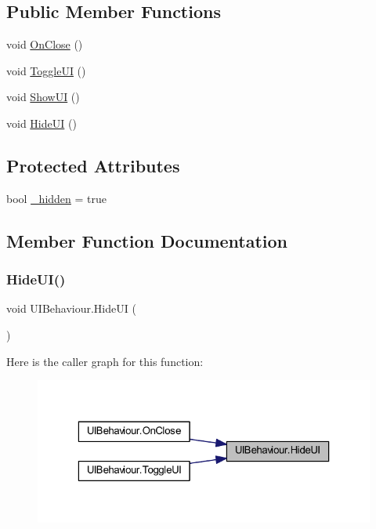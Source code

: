 \subsection*{Public Member Functions}
\begin{DoxyCompactItemize}
\item 
void \mbox{\hyperlink{class_u_i_behaviour_a058150104cbc5deee5bb2d2c8811380a}{On\+Close}} ()
\item 
void \mbox{\hyperlink{class_u_i_behaviour_a508b07927b86c1f75ab1eeb45674f040}{Toggle\+UI}} ()
\item 
void \mbox{\hyperlink{class_u_i_behaviour_a14585d2d40b493d7999564d8a51d51c5}{Show\+UI}} ()
\item 
void \mbox{\hyperlink{class_u_i_behaviour_a16ec3362b1f53b371aa8c5a8a3ec80e7}{Hide\+UI}} ()
\end{DoxyCompactItemize}
\subsection*{Protected Attributes}
\begin{DoxyCompactItemize}
\item 
bool \mbox{\hyperlink{class_u_i_behaviour_a0421d4dc2987f0c48b88cc6175d993e5}{\+\_\+hidden}} = true
\end{DoxyCompactItemize}


\subsection{Member Function Documentation}
\mbox{\label{class_u_i_behaviour_a16ec3362b1f53b371aa8c5a8a3ec80e7}} 
\subsubsection{\texorpdfstring{HideUI()}{HideUI()}}
{\footnotesize\ttfamily void U\+I\+Behaviour.\+Hide\+UI (\begin{DoxyParamCaption}{ }\end{DoxyParamCaption})}

Here is the caller graph for this function\+:
\nopagebreak
\begin{figure}[H]
\begin{center}
\leavevmode
\includegraphics[width=323pt]{class_u_i_behaviour_a16ec3362b1f53b371aa8c5a8a3ec80e7_icgraph}
\end{center}
\end{figure}
\mbox{\label{class_u_i_behaviour_a058150104cbc5deee5bb2d2c8811380a}} 
